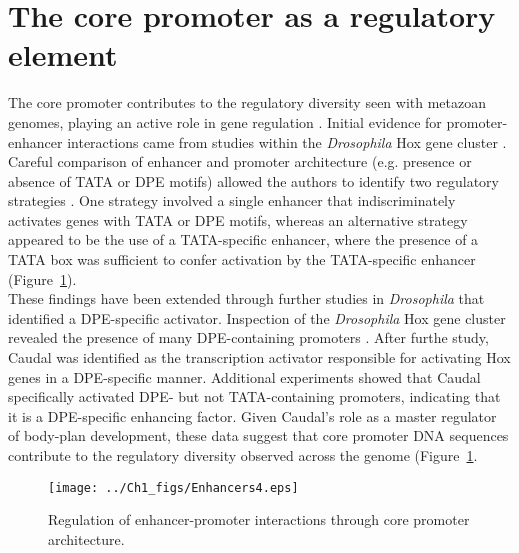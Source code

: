\section{The core promoter as a regulatory element}

The core promoter contributes to the regulatory diversity seen with metazoan genomes, playing an active role in gene regulation \cite{Juven-Gershon_468}. Initial evidence for promoter-enhancer interactions came from studies within the \emph{Drosophila} Hox gene cluster \cite{Ohtsuki_2485}. Careful comparison of enhancer and promoter architecture (e.g. presence or absence of TATA or DPE motifs) allowed the authors to identify two regulatory strategies \cite{Ohtsuki_2485}.  One strategy involved a single enhancer that indiscriminately activates genes with TATA or DPE motifs, whereas an alternative strategy appeared to be the use of a TATA-specific enhancer, where the presence of a TATA box was sufficient to confer activation by the TATA-specific enhancer (Figure~\ref{fig:Enhancers}). \\
\indent These findings have been extended through further studies in \emph{Drosophila} that identified a DPE-specific activator. Inspection of the \emph{Drosophila} Hox gene cluster revealed the presence of many DPE-containing promoters \cite{Juven-Gershon_776}. After furthe study, Caudal was identified as the transcription activator responsible for activating Hox genes in a DPE-specific manner. Additional experiments showed that Caudal specifically activated DPE- but not TATA-containing promoters, indicating that it is a DPE-specific enhancing factor. Given Caudal's role as a master regulator of body-plan development, these data suggest that core promoter DNA sequences contribute to the regulatory diversity observed across the genome (Figure~\ref{fig:Enhancers}.\\ 
\begin{figure}
\centering
\texttt{[image: ../Ch1\_figs/Enhancers4.eps]}
\caption[Regulation of enhancer-promoter interactions through core promoter architecture]{Regulation of enhancer-promoter interactions through core promoter architecture.}
\label{fig:Enhancers}
\end{figure}
